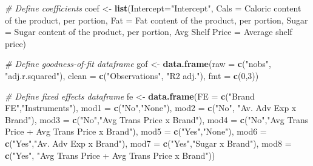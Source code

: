 \documentclass[
]{article}
\newenvironment{Shaded}{\begin{snugshade}}{\end{snugshade}}
\newcommand{\AttributeTok}[1]{\textcolor[rgb]{0.13,0.29,0.53}{#1}}
\newcommand{\CommentTok}[1]{\textcolor[rgb]{0.56,0.35,0.01}{\textit{#1}}}
\newcommand{\DecValTok}[1]{\textcolor[rgb]{0.00,0.00,0.81}{#1}}
\newcommand{\FunctionTok}[1]{\textcolor[rgb]{0.13,0.29,0.53}{\textbf{#1}}}
\newcommand{\NormalTok}[1]{#1}
\newcommand{\OtherTok}[1]{\textcolor[rgb]{0.56,0.35,0.01}{#1}}
\newcommand{\StringTok}[1]{\textcolor[rgb]{0.31,0.60,0.02}{#1}}
\begin{document}
\begin{Shaded}
\begin{Highlighting}[]
\CommentTok{\# Define coefficients}
\NormalTok{coef }\OtherTok{\textless{}{-}} \FunctionTok{list}\NormalTok{(}\StringTok{\textquotesingle{}Intercept\textquotesingle{}}\OtherTok{=}\StringTok{"Intercept"}\NormalTok{,}
             \StringTok{\textquotesingle{}Cals\textquotesingle{}} \OtherTok{=} \StringTok{\textquotesingle{}Caloric content of the product, per portion\textquotesingle{}}\NormalTok{,}
             \StringTok{\textquotesingle{}Fat\textquotesingle{}} \OtherTok{=} \StringTok{\textquotesingle{}Fat content of the product, per portion\textquotesingle{}}\NormalTok{,}
             \StringTok{\textquotesingle{}Sugar\textquotesingle{}} \OtherTok{=} \StringTok{\textquotesingle{}Sugar content of the product, per portion\textquotesingle{}}\NormalTok{,}
             \StringTok{\textquotesingle{}Avg Shelf Price\textquotesingle{}} \OtherTok{=} \StringTok{\textquotesingle{}Average shelf price\textquotesingle{}}\NormalTok{)}

\CommentTok{\# Define goodness{-}of{-}fit dataframe}
\NormalTok{gof }\OtherTok{\textless{}{-}}  \FunctionTok{data.frame}\NormalTok{(}\AttributeTok{raw =} \FunctionTok{c}\NormalTok{(}\StringTok{"nobs"}\NormalTok{, }\StringTok{"adj.r.squared"}\NormalTok{),}
                   \AttributeTok{clean =} \FunctionTok{c}\NormalTok{(}\StringTok{"Observations"}\NormalTok{, }\StringTok{"R2 adj."}\NormalTok{),}
                   \AttributeTok{fmt =} \FunctionTok{c}\NormalTok{(}\DecValTok{0}\NormalTok{,}\DecValTok{3}\NormalTok{))}

\CommentTok{\# Define fixed effects dataframe}
\NormalTok{fe }\OtherTok{\textless{}{-}} \FunctionTok{data.frame}\NormalTok{(}\AttributeTok{FE =} \FunctionTok{c}\NormalTok{(}\StringTok{"Brand FE"}\NormalTok{,}\StringTok{"Instruments"}\NormalTok{),}
                 \AttributeTok{mod1 =} \FunctionTok{c}\NormalTok{(}\StringTok{"No"}\NormalTok{,}\StringTok{"None"}\NormalTok{),}
                 \AttributeTok{mod2 =} \FunctionTok{c}\NormalTok{(}\StringTok{"No"}\NormalTok{, }\StringTok{"Av. Adv Exp x Brand"}\NormalTok{),}
                 \AttributeTok{mod3 =} \FunctionTok{c}\NormalTok{(}\StringTok{"No"}\NormalTok{,}\StringTok{"Avg Trans Price x Brand"}\NormalTok{),}
                 \AttributeTok{mod4 =} \FunctionTok{c}\NormalTok{(}\StringTok{"No"}\NormalTok{,}\StringTok{"Avg Trans Price + Avg Trans Price x Brand"}\NormalTok{),}
                 \AttributeTok{mod5 =} \FunctionTok{c}\NormalTok{(}\StringTok{"Yes"}\NormalTok{,}\StringTok{"None"}\NormalTok{),}
                 \AttributeTok{mod6 =} \FunctionTok{c}\NormalTok{(}\StringTok{"Yes"}\NormalTok{,}\StringTok{"Av. Adv Exp x Brand"}\NormalTok{),}
                 \AttributeTok{mod7 =} \FunctionTok{c}\NormalTok{(}\StringTok{"Yes"}\NormalTok{,}\StringTok{"Sugar x Brand"}\NormalTok{),}
                 \AttributeTok{mod8 =} \FunctionTok{c}\NormalTok{(}\StringTok{"Yes"}\NormalTok{, }\StringTok{"Avg Trans Price  + Avg Trans Price x Brand"}\NormalTok{))}
                  

\end{Highlighting}
\end{Shaded}
\end{document}
